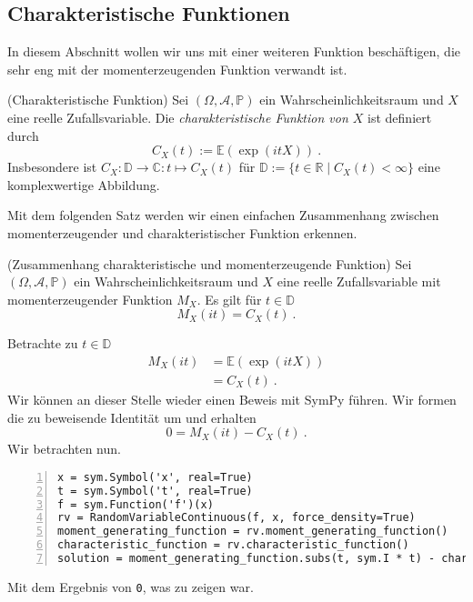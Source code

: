 \subsection{Charakteristische Funktionen}

In diesem Abschnitt wollen wir uns mit einer weiteren Funktion beschäftigen, die sehr eng mit der momenterzeugenden Funktion verwandt ist.

\begin{Definition}{(Charakteristische Funktion)}
Sei $(\Omega, \mathscr{A}, \mathbb{P})$ ein Wahrscheinlichkeitsraum und $X$ eine reelle Zufallsvariable. Die \textit{charakteristische Funktion von $X$}  ist definiert durch
\[C_X(t) := \mathbb{E}\left( \exp(i t X) \right)~.\]
Insbesondere ist $C_X: \mathbb{D} \rightarrow \mathbb{C}: t \mapsto C_X(t)$ für $\mathbb{D} := \{ t \in \mathbb{R} \mid C_X(t) < \infty\}$ eine komplexwertige Abbildung.
\end{Definition}

Mit dem folgenden Satz werden wir einen einfachen Zusammenhang zwischen momenterzeugender und charakteristischer Funktion erkennen.

\begin{Satz}{(Zusammenhang charakteristische und momenterzeugende Funktion)}
Sei $(\Omega, \mathscr{A}, \mathbb{P})$ ein Wahrscheinlichkeitsraum und $X$ eine reelle Zufallsvariable mit momenterzeugender Funktion $M_X$. Es gilt für $t \in \mathbb{D}$
\[M_X(i t) = C_X(t)~.\]
\end{Satz}

\begin{Beweis}{}
Betrachte zu $t \in \mathbb{D}$
\begin{align*}
M_X\left( i t \right) &= \mathbb{E}\left( \exp(i t X) \right)\\
&= C_X(t)~.
\end{align*}
Wir können an dieser Stelle wieder einen \glqq Beweis\grqq{} mit SymPy führen. Wir formen die zu beweisende Identität um und erhalten
\[0 = M_X(i t) - C_X(t)~.\]
Wir betrachten nun.
\begin{lstlisting}[numbers=left, numberstyle=\tiny\color{codegray}]
x = sym.Symbol('x', real=True)
t = sym.Symbol('t', real=True)
f = sym.Function('f')(x)
rv = RandomVariableContinuous(f, x, force_density=True)
moment_generating_function = rv.moment_generating_function()
characteristic_function = rv.characteristic_function()
solution = moment_generating_function.subs(t, sym.I * t) - characteristic_function
\end{lstlisting}
Mit dem Ergebnis von \lstinline|0|, was zu zeigen war.
\end{Beweis}

